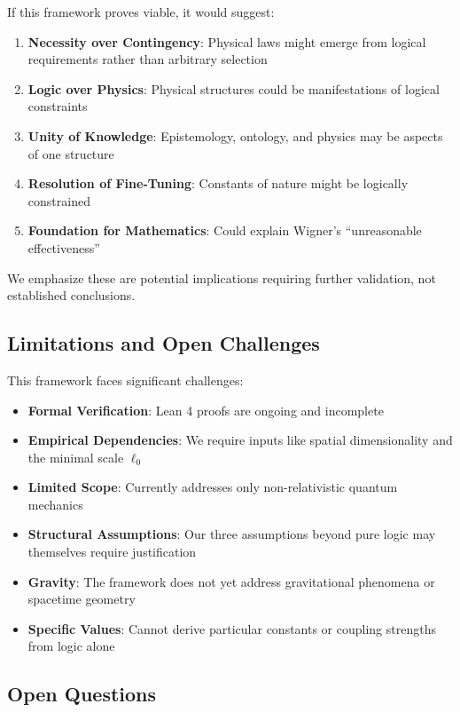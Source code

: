 \documentclass[12pt,a4paper]{article}
\begin{document}
If this framework proves viable, it would suggest:

\begin{enumerate}
\item \textbf{Necessity over Contingency}: Physical laws might emerge from logical requirements rather than arbitrary selection
\item \textbf{Logic over Physics}: Physical structures could be manifestations of logical constraints
\item \textbf{Unity of Knowledge}: Epistemology, ontology, and physics may be aspects of one structure
\item \textbf{Resolution of Fine-Tuning}: Constants of nature might be logically constrained
\item \textbf{Foundation for Mathematics}: Could explain Wigner's ``unreasonable effectiveness''
\end{enumerate}

We emphasize these are potential implications requiring further validation, not established conclusions.

\subsection{Limitations and Open Challenges}

This framework faces significant challenges:

\begin{itemize}
\item \textbf{Formal Verification}: Lean 4 proofs are ongoing and incomplete
\item \textbf{Empirical Dependencies}: We require inputs like spatial dimensionality and the minimal scale $\ell_0$
\item \textbf{Limited Scope}: Currently addresses only non-relativistic quantum mechanics
\item \textbf{Structural Assumptions}: Our three assumptions beyond pure logic may themselves require justification
\item \textbf{Gravity}: The framework does not yet address gravitational phenomena or spacetime geometry
\item \textbf{Specific Values}: Cannot derive particular constants or coupling strengths from logic alone
\end{itemize}

\subsection{Open Questions}
\end{document}
